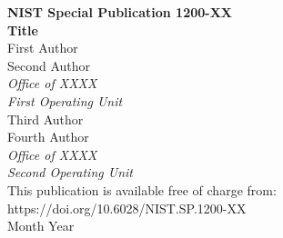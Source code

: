 \documentclass[12pt]{article}
\newcommand{\pubnumber}{1200-XX}
\newcommand{\DOI}{https://doi.org/10.6028/NIST.SP.1200-XX}
\newcommand{\monthyear}{Month Year}
\begin{document}
\begin{titlepage}
\begin{flushright}
\LARGE{\textbf{NIST Special Publication \pubnumber}}\\
\vfill 
\Huge{\textbf{Title}}\\
\vfill
\normalsize First Author\\
Second Author\\
\textit{Office of XXXX}\\
\textit{First Operating Unit}\\
\vspace{12pt}
Third Author\\
Fourth Author\\
\textit{Office of XXXX}\\
\textit{Second Operating Unit}\\
\vfill
\normalsize This publication is available free of charge from:\\
\DOI\\
\vfill
\normalsize \monthyear
\vfill


\end{flushright}
\end{titlepage}
\end{document}
